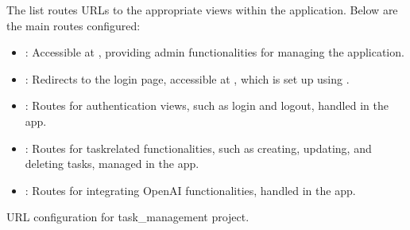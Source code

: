 \documentclass[letterpaper,10pt,english]{sphinxmanual}
\begin{document}
\sphinxAtStartPar
The  list routes URLs to the appropriate views within the application. Below are the main routes configured:
\begin{itemize}
\item {} 
\sphinxAtStartPar
{}: Accessible at , providing admin functionalities for managing the application.

\item {} 
\sphinxAtStartPar
{}: Redirects to the login page, accessible at \sphinxtitleref{/}, which is set up using .

\item {} 
\sphinxAtStartPar
{}: Routes for authentication views, such as login and logout, handled in the  app.

\item {} 
\sphinxAtStartPar
{}: Routes for task\sphinxhyphen{}related functionalities, such as creating, updating, and deleting tasks, managed in the  app.

\item {} 
\sphinxAtStartPar
{}: Routes for integrating OpenAI functionalities, handled in the  app.

\end{itemize}
\label{\detokenize{task_management:module-task_management.urls}}
\sphinxAtStartPar
URL configuration for task\_management project.
\begin{description}
\sphinxAtStartPar
{}

\end{description}
\end{document}
